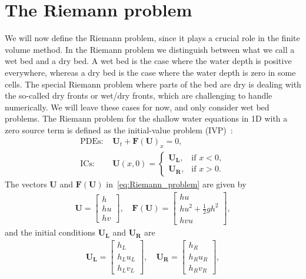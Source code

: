\section{The Riemann problem}
We will now define the Riemann problem, since it plays a crucial role in the finite volume method.
In the Riemann problem we distinguish between what we call a wet bed and a dry bed. 
A wet bed is the case where the water depth is positive everywhere, whereas a dry bed is the case where the water depth is zero in some cells.
The special Riemann problem where parts of the bed are dry is dealing with the so-called dry fronts or wet/dry fronts, which are challenging to handle numerically.
We will leave these cases for now, and only consider wet bed problems.
The Riemann problem for the shallow water equations in 1D with a zero source term is defined as the initial-value problem (IVP)~\cite{Toro2024}:
\begin{equation}\label{eq:Riemann_problem}
    \begin{aligned}
        \text{PDEs: } &\mathbf{U}_t + {\mathbf{F(U)}}_x = 0, \\
        \text{ICs: } &\mathbf{U}(x, 0) = \begin{cases}
            \mathbf{U_L}, & \text{if  } x < 0, \\
            \mathbf{U_R}, & \text{if  } x > 0.
        \end{cases}
    \end{aligned}
    \end{equation}
The vectors $\mathbf{U}$ and $\mathbf{F(U)}$ in~\eqref{eq:Riemann_problem} are given by
\begin{align}
    \mathbf{U} = \begin{bmatrix}
        h \\ hu \\ hv
    \end{bmatrix}, \quad
    \mathbf{F(U)} = \begin{bmatrix}
        hu \\ hu^2 + \frac{1}{2}gh^2 \\ hvu
    \end{bmatrix},
\end{align}
and the initial conditions $\mathbf{U_L}$ and $\mathbf{U_R}$ are
\begin{align*}
    \mathbf{U_L} = \begin{bmatrix}
        h_L \\ h_L u_L \\ h_L v_L
    \end{bmatrix}, \quad 
    \mathbf{U_R} = \begin{bmatrix}
        h_R \\ h_R u_R \\ h_R v_R
    \end{bmatrix},
\end{align*}
